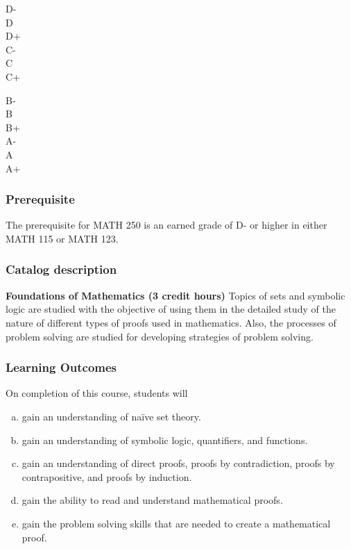 \documentclass[12pt]{article}
\newcounter{ex}\setcounter{ex}{0}
\newenvironment{mypar}[2]
  {\begin{list}{}%
    {\setlength\leftmargin{#1}
    \setlength\rightmargin{#2}}
    \item[]}
  {\end{list}}
\newenvironment{alphalist}{
  \begin{enumerate}[(a)]
    \addtolength{\itemsep}{-0.75\itemsep}}
  {\end{enumerate}}
\begin{document}
 \vspace{0.1in}
     \begin{minipage}{5.5in}
  \centering 
\begin{mypar}{0.25in}{0.25in}
    \begin{minipage}{2.5in}
        D-  \dotfill \Dm \\
        D \dotfill \D \\
        D+ \dotfill \Dp \\
        C- \dotfill \Cm  \\
        C \dotfill \C \\
        C+ \dotfill \Cp 
        \end{minipage}
    \phantom{xxx}
    \begin{minipage}{2.5in}
        B- \dotfill \Bm \\
        B \dotfill  \B \\
        B+ \dotfill  \Bp\\
        A- \dotfill  \Am \\
        A \dotfill  \A \\
        A+ \dotfill  \Ap
    \end{minipage}
\end{mypar} 
\end{minipage}

\subsubsection*{Prerequisite}

The prerequisite for MATH 250 is an earned grade of D- or higher in either MATH 115 or MATH 123.

\subsubsection*{Catalog description}

\textbf{Foundations of Mathematics (3 credit hours)} Topics of sets and symbolic logic are studied with the objective of using them in the detailed study of the nature of different types of proofs used in mathematics. Also, the processes of problem solving are studied for developing strategies of problem solving.

\subsubsection*{Learning Outcomes}

On completion of this course, students will
\begin{alphalist}
    \item gain an understanding of na\"ive set theory. 
    \item gain an understanding of symbolic logic, quantifiers, and functions.
    \item gain an understanding of direct proofs, proofs by contradiction, proofs by contrapositive, and proofs by induction.
    \item gain the ability to read and understand mathematical proofs.
    \item gain the problem solving skills that are needed to create a mathematical proof.
\end{alphalist}
\end{document}
